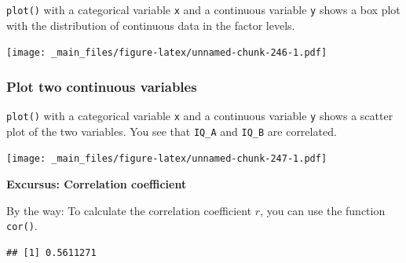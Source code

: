 \documentclass[
]{scrartcl}
\newenvironment{Shaded}{\begin{snugshade}}{\end{snugshade}}
\newcommand{\DataTypeTok}[1]{\textcolor[rgb]{0.13,0.29,0.53}{#1}}
\newcommand{\KeywordTok}[1]{\textcolor[rgb]{0.13,0.29,0.53}{\textbf{#1}}}
\newcommand{\NormalTok}[1]{#1}
\newcommand{\OperatorTok}[1]{\textcolor[rgb]{0.81,0.36,0.00}{\textbf{#1}}}
\newenvironment{webexsolution}[1]
    {\par\tiny\textbf{#1}}
    {\par}
\newcommand{\webexhide}[1]{\begin{webexsolution}{#1}}
\begin{document}
\texttt{plot()} with a categorical variable \texttt{x} and a continuous variable \texttt{y} shows a box plot with the distribution of continuous data in the factor levels.

\begin{Shaded}
\end{Shaded}

\texttt{[image: \_main\_files/figure-latex/unnamed-chunk-246-1.pdf]}

\hypertarget{plot-two-continuous-variables}{%
\subsubsection{Plot two continuous variables}\label{plot-two-continuous-variables}}

\texttt{plot()} with a categorical variable \texttt{x} and a continuous variable \texttt{y} shows a scatter plot of the two variables. You see that \texttt{IQ\_A} and \texttt{IQ\_B} are correlated.

\begin{Shaded}
\end{Shaded}

\texttt{[image: \_main\_files/figure-latex/unnamed-chunk-247-1.pdf]}
\webexhide{Excursus: Correlation coefficient}

By the way: To calculate the correlation coefficient \(r\), you can use the function \texttt{cor()}.

\begin{Shaded}
\end{Shaded}

\begin{verbatim}
## [1] 0.5611271
\end{verbatim}
\end{document}
